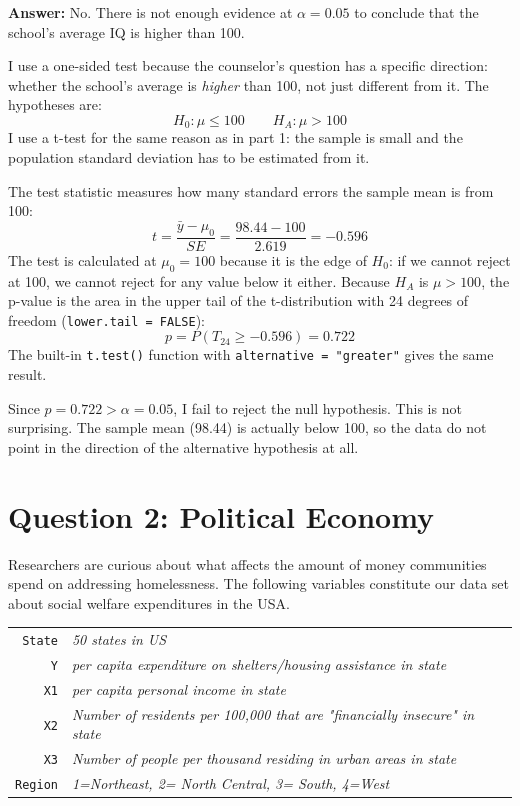 \documentclass[12pt,letterpaper]{article}
\begin{document}
\begin{enumerate}
	  
	
	\noindent \textbf{Answer:} No. There is not enough evidence at $\alpha = 0.05$ to conclude that the school's average IQ is higher than 100.
	
	\noindent I use a one-sided test because the counselor's question has a specific direction: whether the school's average is \textit{higher} than 100, not just different from it. The hypotheses are:
	\[ H_0: \mu \le 100 \qquad H_A: \mu > 100 \]
	I use a t-test for the same reason as in part 1: the sample is small and the population standard deviation has to be estimated from it.
	
	\noindent The test statistic measures how many standard errors the sample mean is from 100:
	\[ t = \frac{\bar{y} - \mu_0}{SE} = \frac{98.44 - 100}{2.619} = -0.596 \]
	The test is calculated at $\mu_0 = 100$ because it is the edge of $H_0$: if we cannot reject at 100, we cannot reject for any value below it either. Because $H_A$ is $\mu > 100$, the p-value is the area in the upper tail of the t-distribution with 24 degrees of freedom (\texttt{lower.tail = FALSE}):
	\[ p = P(T_{24} \ge -0.596) = 0.722 \]
	The built-in \texttt{t.test()} function with \texttt{alternative = "greater"} gives the same result.
	
	\noindent Since $p = 0.722 > \alpha = 0.05$, I fail to reject the null hypothesis. This is not surprising. The sample mean (98.44) is actually below 100, so the data do not point in the direction of the alternative hypothesis at all.
	
\end{enumerate}

\newpage

	\section*{Question 2: Political Economy}

\noindent Researchers are curious about what affects the amount of money communities spend on addressing homelessness. The following variables constitute our data set about social welfare expenditures in the USA. \\
\vspace{.5cm}


\begin{tabular}{r|l}
	\texttt{State} &\emph{50 states in US} \\
	\texttt{Y} & \emph{per capita expenditure on shelters/housing assistance in state}\\
	\texttt{X1} &\emph{per capita personal income in state} \\
	\texttt{X2} &  \emph{Number of residents per 100,000 that are "financially insecure" in state}\\
	\texttt{X3} &  \emph{Number of people per thousand residing in urban areas in state} \\
	\texttt{Region} &  \emph{1=Northeast, 2= North Central, 3= South, 4=West} \\
\end{tabular}
\end{document}
